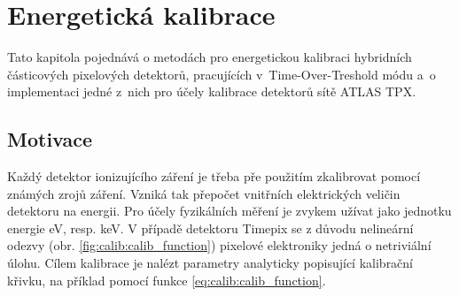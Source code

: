

\chapter{Energetická kalibrace}\label{calib}
Tato kapitola pojednává o metodách pro energetickou kalibraci hybridních částicových pixelových detektorů, pracujících v~Time-Over-Treshold módu a~o implementaci jedné z~nich pro účely kalibrace detektorů sítě ATLAS TPX.

\section{Motivace}

Každý detektor ionizujícího záření je třeba pře použitím zkalibrovat pomocí známých zrojů záření. Vzniká tak přepočet vnitřních elektrických veličin detektoru na energii. Pro účely fyzikálních měření je zvykem užívat jako jednotku energie eV, resp. keV. 
V případě detektoru Timepix se z důvodu nelineární odezvy (obr. \ref{fig:calib:calib_function}) pixelové elektroniky jedná o netriviální úlohu. Cílem kalibrace je nalézt parametry analyticky popisující kalibrační křivku, na příklad pomocí funkce \ref{eq:calib:calib_function}.

